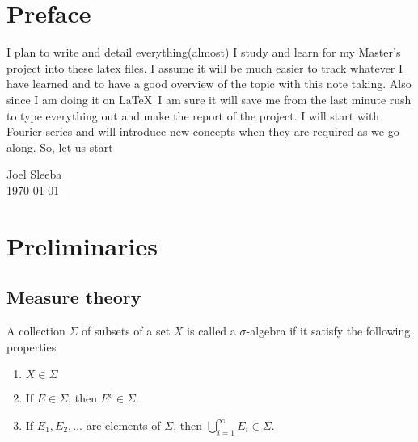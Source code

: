 \section{Preface}
I plan to write and detail everything(almost) I study and learn for my Master's project into these latex files. I assume it will be much easier to track whatever I have learned and to have a good overview of the topic with this note taking. Also since I am doing it on \LaTeX\ I am sure it will save me from the last minute rush to type everything out and make the report of the project. I will start with Fourier series and will introduce new concepts when they are required as we go along. So, let us start


Joel Sleeba\\
\today

\newpage

\section{Preliminaries}

  \subsection{Measure theory}

  \begin{definition}
    \label{def:sigma_algrebra}
    A collection $\Sigma$ of subsets of a set $X$ is called a $\sigma$-algebra if it satisfy the following properties
    \begin{enumerate}
      \item $X\in \Sigma$
      \item If $E \in \Sigma$, then $E^c \in \Sigma$.
    \item If $E_1, E_2, \dots$ are elements of $\Sigma$, then $\bigcup_{i=1}^\infty E_i \in \Sigma$.
    \end{enumerate}
  \end{definition}
